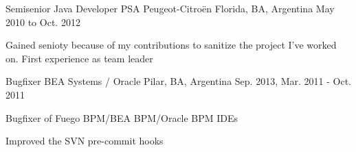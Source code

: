\begin{cventries}

	\cventry
	{Semisenior Java Developer} %
	{PSA Peugeot-Citroën} %
	{Florida, BA, Argentina} %
	{May 2010 to Oct. 2012} %
	{ %
		\begin{cvitems}
			\item { Gained senioty because of my contributions to sanitize the project I've worked on. }
			      { First experience as team leader }
		\end{cvitems}
	}


	\cventry
	{Bugfixer} %
	{BEA Systems / Oracle} %
	{Pilar, BA, Argentina} %
	{Sep. 2013, Mar. 2011 - Oct. 2011} %
	{
		\begin{cvitems}
			\item {Bugfixer of Fuego BPM/BEA BPM/Oracle BPM IDEs}
			\item {Improved the SVN pre-commit hooks}
		\end{cvitems}
	}


\end{cventries}
